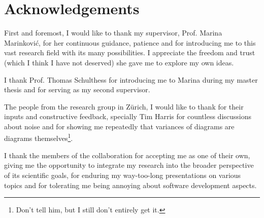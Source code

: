 
\bigskip

\begingroup
\let\clearpage\relax
\let\cleardoublepage\relax
\let\cleardoublepage\relax
\chapter*{Acknowledgements}

\def\thanks#1{%
\begingroup
\leftskip1em
\noindent #1
\par
\endgroup
}



First and foremost, I would like to thank my supervisor, Prof. Marina Marinković, for her continuous guidance, patience and for introducing me to this vast research field with its many possibilities.
I appreciate the freedom and trust (which I think I have not deserved) she gave me to explore my own ideas.

I thank Prof. Thomas Schulthess for introducing me to Marina during my master thesis and for serving as my second supervisor.

The people from the research group in Zürich, I would like to thank for their inputs and constructive feedback, specially Tim Harris for countless discussions about noise and for showing me repeatedly that variances of diagrams are diagrams themselves\footnote{Don't tell him, but I still don't entirely get it.}.

I thank the members of the \RCstar collaboration for accepting me as one of their own, giving me the opportunity to integrate my research into the broader perspective of its scientific goals, for enduring my way-too-long presentations on various topics and for tolerating me being annoying about software development aspects.


